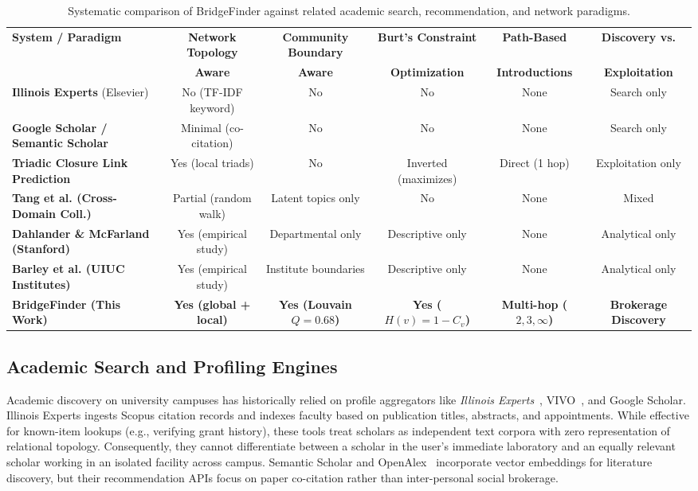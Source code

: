 \begin{table}[t]
\centering
\small
\caption{Systematic comparison of BridgeFinder against related academic search, recommendation, and network paradigms.}
\label{tab:related_work}
\begin{tabularx}{\textwidth}{lccccc}
\toprule
\textbf{System / Paradigm} & \textbf{Network Topology} & \textbf{Community Boundary} & \textbf{Burt's Constraint} & \textbf{Path-Based} & \textbf{Discovery vs.} \\
& \textbf{Aware} & \textbf{Aware} & \textbf{Optimization} & \textbf{Introductions} & \textbf{Exploitation} \\
\midrule
\textbf{Illinois Experts} (Elsevier)~\cite{experts} & No (TF-IDF keyword) & No & No & None & Search only \\
\textbf{Google Scholar / Semantic Scholar} & Minimal (co-citation) & No & No & None & Search only \\
\textbf{Triadic Closure Link Prediction}~\cite{libennowell2007} & Yes (local triads) & No & Inverted (maximizes) & Direct (1 hop) & Exploitation only \\
\textbf{Tang et al. (Cross-Domain Coll.)}~\cite{tang2012} & Partial (random walk) & Latent topics only & No & None & Mixed \\
\textbf{Dahlander \& McFarland (Stanford)}~\cite{dahlander2013} & Yes (empirical study) & Departmental only & Descriptive only & None & Analytical only \\
\textbf{Barley et al. (UIUC Institutes)}~\cite{barley2025} & Yes (empirical study) & Institute boundaries & Descriptive only & None & Analytical only \\
\midrule
\textbf{BridgeFinder (This Work)} & \textbf{Yes (global + local)} & \textbf{Yes (Louvain $Q=0.68$)} & \textbf{Yes ($H(v)=1-C_v$)} & \textbf{Multi-hop ($2, 3, \infty$)} & \textbf{Brokerage Discovery} \\
\bottomrule
\end{tabularx}
\vspace{-3pt}
\end{table}

\subsection{Academic Search and Profiling Engines}
Academic discovery on university campuses has historically relied on profile aggregators like \emph{Illinois Experts}~\cite{experts}, VIVO~\cite{vivo2012}, and Google Scholar. Illinois Experts ingests Scopus citation records and indexes faculty based on publication titles, abstracts, and appointments. While effective for known-item lookups (e.g., verifying grant history), these tools treat scholars as independent text corpora with zero representation of relational topology. Consequently, they cannot differentiate between a scholar in the user's immediate laboratory and an equally relevant scholar working in an isolated facility across campus. Semantic Scholar and OpenAlex~\cite{openalex} incorporate vector embeddings for literature discovery, but their recommendation APIs focus on paper co-citation rather than inter-personal social brokerage.

